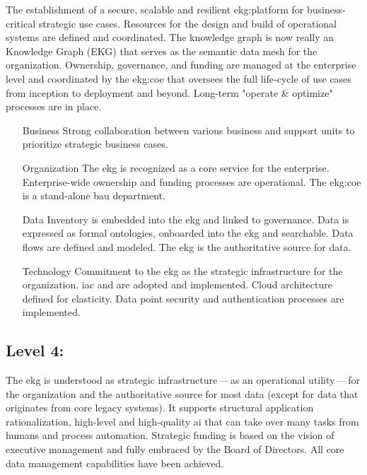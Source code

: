 The establishment of a secure, scalable and resilient \gls{ekg:platform} for business-critical strategic use cases.
Resources for the design and build of operational systems are defined and coordinated.
The knowledge graph is now really an  Knowledge Graph (EKG) that serves as the
semantic data mesh for the organization.
Ownership, governance, and funding are managed at the enterprise level and coordinated by the \gls{ekg:coe} that
oversees the full life-cycle of use cases from inception to deployment and beyond.
Long-term "operate \& optimize" processes are in place.

\begin{itemize}[leftmargin=1in,font=\bfseries]

    \item[Business]     Strong collaboration between various business and support units to prioritize
                        strategic business cases.
    \item[Organization] The \gls{ekg} is recognized as a core service for the enterprise.
                        Enterprise-wide ownership and funding processes are operational.
                        The \gls{ekg:coe} is a stand-alone \gls{bau} department.
    \item[Data]         Inventory is embedded into the \gls{ekg} and linked to governance.
                        Data is expressed as formal ontologies, onboarded into the \gls{ekg} and searchable.
                        Data flows are defined and modeled.
                        The \gls{ekg} is the authoritative source for data.
    \item[Technology]   Commitment to the \gls{ekg} as the strategic infrastructure for the organization.
                        \Gls{iac} and  are adopted and implemented.
                        Cloud architecture defined for elasticity.
                        Data point security and authentication processes are implemented.
\end{itemize}

\subsection{Level 4: \ekgmmLevelFourLabel}

The \gls{ekg} is understood as strategic infrastructure\,---\,as an operational utility\,---\,for the organization
and the authoritative source for most data (except for data that originates from core legacy systems).
It supports structural application rationalization, high-level and high-quality \gls{ai}
that can take over many tasks from humans and process automation.
Strategic funding is based on the vision of executive management and fully embraced by the Board of Directors.
All core data management capabilities have been achieved.

